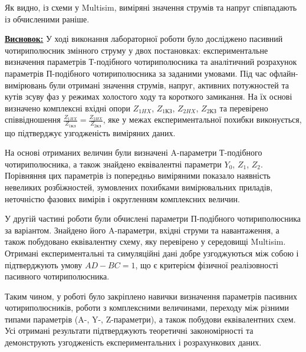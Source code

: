 \documentclass[12pt,a4paper]{article}
\begin{document}
    Як видно, із схеми у Multisim, виміряні значення струмів та напруг співпадають із обчисленими раніше.

    \vspace{1em}

    \noindent
    \textbf{\underline{Висновок:}} У ході виконання лабораторної роботи було досліджено пасивний чотириполюсник змінного струму у двох постановках: 
    експериментальне визначення параметрів Т-подібного чотириполюсника та аналітичний розрахунок параметрів 
    П-подібного чотириполюсника за заданими умовами. Під час офлайн-вимірювань були отримані значення струмів, напруг, 
    активних потужностей та кутів зсуву фаз у режимах холостого ходу та короткого замикання. На їх основі визначено 
    комплексні вхідні опори $Z_{1HX}$, $Z_{1\text{КЗ}}$, $Z_{2HX}$, $Z_{2\text{КЗ}}$ та перевірено співвідношення 
    $\frac{Z_{1HX}}{Z_{1\text{КЗ}}} = \frac{Z_{2HX}}{Z_{2\text{КЗ}}}$, яке у межах експериментальної похибки виконується, що підтверджує 
    узгодженість виміряних даних.

    На основі отриманих величин були визначені A-параметри Т-подібного чотириполюсника, а також знайдено 
    еквівалентні параметри $Y_0$, $Z_1$, $Z_2$. Порівняння цих параметрів із попередньо виміряними показало наявність 
    невеликих розбіжностей, зумовлених похибками вимірювальних приладів, неточністю фазових вимірів і округленням 
    комплексних величин.

    У другій частині роботи були обчислені параметри П-подібного чотириполюсника за варіантом. Знайдено його 
    A-параметри, вхідні струми та навантаження, а також побудовано еквівалентну схему, яку перевірено у середовищі 
    Multisim. Отримані експериментальні та симуляційні дані добре узгоджуються між собою і підтверджують умову 
    $AD - BC = 1$, що є критерієм фізичної реалізовності пасивного чотириполюсника.

    Таким чином, у роботі було закріплено навички визначення параметрів пасивних чотириполюсників, роботи з 
    комплексними величинами, переходу між різними типами параметрів (A-, Y-, Z-параметри), а також побудови 
    еквівалентних схем. Усі отримані результати підтверджують теоретичні закономірності та демонструють 
узгодженість експериментальних і розрахункових даних.
\end{document}
